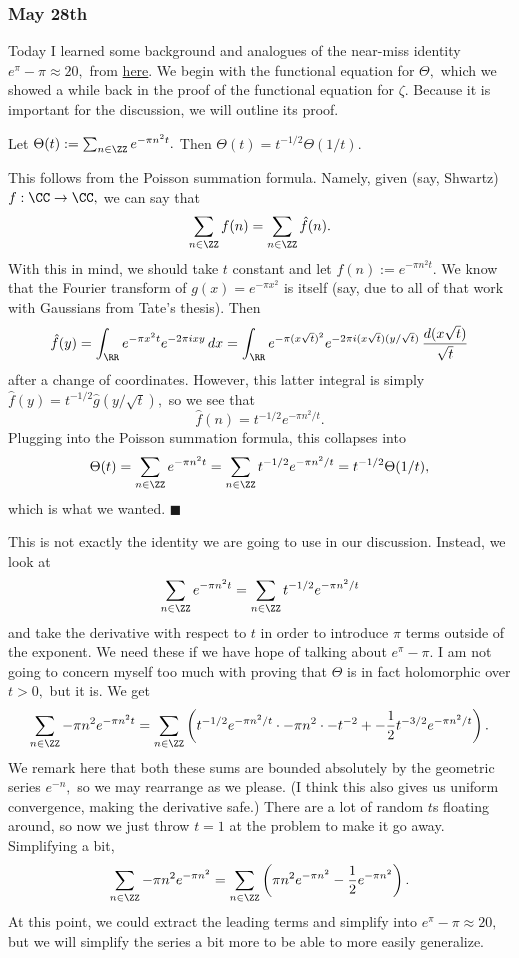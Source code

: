 \subsubsection{May 28th}
Today I learned some background and analogues of the near-miss identity $e^\pi-\pi\approx20,$ from \href{https://mathoverflow.net/questions/131528#comment339695_131557}{here}. We begin with the functional equation for $\Theta,$ which we showed a while back in the proof of the functional equation for $\zeta.$ Because it is important for the discussion, we will outline its proof.
\begin{proposition}
    Let $\Theta(t):=\sum_{n\in\ZZ}e^{-\pi n^2t}.$ Then $\Theta(t)=t^{-1/2}\Theta(1/t).$
\end{proposition}
This follows from the Poisson summation formula. Namely, given (say, Shwartz) $f:\CC\to\CC,$ we can say that
\[\sum_{n\in\ZZ}f(n)=\sum_{n\in\ZZ}\hat f(n).\]
With this in mind, we should take $t$ constant and let $f(n):=e^{-\pi n^2t}.$ We know that the Fourier transform of $g(x)=e^{-\pi x^2}$ is itself (say, due to all of that work with Gaussians from Tate's thesis). Then
\[\hat f(y)=\int_\RR e^{-\pi x^2t}e^{-2\pi ixy}\,dx=\int_\RR e^{-\pi(x\sqrt t)^2}e^{-2\pi i(x\sqrt t)(y/\sqrt t)}\,\frac{d(x\sqrt t)}{\sqrt t}\]
after a change of coordinates. However, this latter integral is simply $\hat f(y)=t^{-1/2}\hat g(y/\sqrt t),$ so we see that
\[\hat f(n)=t^{-1/2}e^{-\pi n^2/t}.\]
Plugging into the Poisson summation formula, this collapses into
\[\Theta(t)=\sum_{n\in\ZZ}e^{-\pi n^2t}=\sum_{n\in\ZZ}t^{-1/2}e^{-\pi n^2/t}=t^{-1/2}\Theta(1/t),\]
which is what we wanted. $\blacksquare$

This is not exactly the identity we are going to use in our discussion. Instead, we look at
\[\sum_{n\in\ZZ}e^{-\pi n^2t}=\sum_{n\in\ZZ}t^{-1/2}e^{-\pi n^2/t}\]
and take the derivative with respect to $t$ in order to introduce $\pi$ terms outside of the exponent. We need these if we have hope of talking about $e^\pi-\pi.$ I am not going to concern myself too much with proving that $\Theta$ is in fact holomorphic over $t>0,$ but it is. We get
\[\sum_{n\in\ZZ}-\pi n^2e^{-\pi n^2t}=\sum_{n\in\ZZ}\left(t^{-1/2}e^{-\pi n^2/t}\cdot-\pi n^2\cdot-t^{-2}+-\frac12t^{-3/2}e^{-\pi n^2/t}\right).\]
We remark here that both these sums are bounded absolutely by the geometric series $e^{-n},$ so we may rearrange as we please. (I think this also gives us uniform convergence, making the derivative safe.) There are a lot of random $t$s floating around, so now we just throw $t=1$ at the problem to make it go away. Simplifying a bit,
\[\sum_{n\in\ZZ}-\pi n^2e^{-\pi n^2}=\sum_{n\in\ZZ}\left(\pi n^2e^{-\pi n^2}-\frac12e^{-\pi n^2}\right).\]
At this point, we could extract the leading terms and simplify into $e^\pi-\pi\approx20,$ but we will simplify the series a bit more to be able to more easily generalize.

